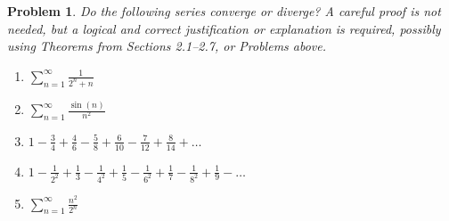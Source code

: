 \documentclass[12pt]{article}
\newtheorem{problem}{Problem}
\begin{document}
\begin{problem} %
Do the following series converge or diverge?  A careful proof is not needed, but a logical and correct justification or explanation is required, possibly using Theorems from Sections 2.1--2.7, or Problems above.

\renewcommand{\labelenumi}{(\alph{enumi})}
\begin{enumerate}
\item $\sum_{n=1}^\infty \frac{1}{2^n+n}$


\item $\sum_{n=1}^\infty \frac{\sin(n)}{n^2}$


\item $1 - \frac{3}{4} + \frac{4}{6} - \frac{5}{8} + \frac{6}{10} - \frac{7}{12} + \frac{8}{14} + \dots$


\item $1 - \frac{1}{2^2} + \frac{1}{3} - \frac{1}{4^2} + \frac{1}{5} - \frac{1}{6^2} + \frac{1}{7} - \frac{1}{8^2} + \frac{1}{9} - \dots$


\item $\sum_{n=1}^\infty \frac{n^2}{2^n}$


\end{enumerate}
\end{problem}
\end{document}
